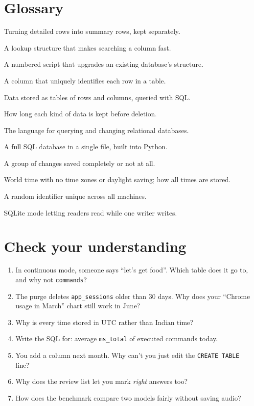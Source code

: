 \documentclass[11pt,a4paper]{article}
\begin{document}
\section{Glossary}
\begin{description}[style=nextline,leftmargin=1.2cm,itemsep=2pt]
  \item[Aggregation / roll-up] Turning detailed rows into summary rows, kept separately.
  \item[Index] A lookup structure that makes searching a column fast.
  \item[Migration] A numbered script that upgrades an existing database's structure.
  \item[Primary key] A column that uniquely identifies each row in a table.
  \item[Relational database] Data stored as tables of rows and columns, queried with SQL.
  \item[Retention policy] How long each kind of data is kept before deletion.
  \item[SQL] The language for querying and changing relational databases.
  \item[SQLite] A full SQL database in a single file, built into Python.
  \item[Transaction] A group of changes saved completely or not at all.
  \item[UTC] World time with no time zones or daylight saving; how all times are stored.
  \item[UUID] A random identifier unique across all machines.
  \item[WAL] SQLite mode letting readers read while one writer writes.
\end{description}

\section{Check your understanding}
\begin{exercise}
\begin{enumerate}
  \item In continuous mode, someone says ``let's get food''. Which table does it go to, and why
        not \texttt{commands}?
  \item The purge deletes \texttt{app\_sessions} older than 30 days. Why does your
        ``Chrome usage in March'' chart still work in June?
  \item Why is every time stored in UTC rather than Indian time?
  \item Write the SQL for: average \texttt{ms\_total} of executed commands today.
  \item You add a column next month. Why can't you just edit the \texttt{CREATE TABLE} line?
  \item Why does the review list let you mark \emph{right} answers too?
  \item How does the benchmark compare two models fairly without saving audio?
\end{enumerate}
\end{exercise}
\end{document}
